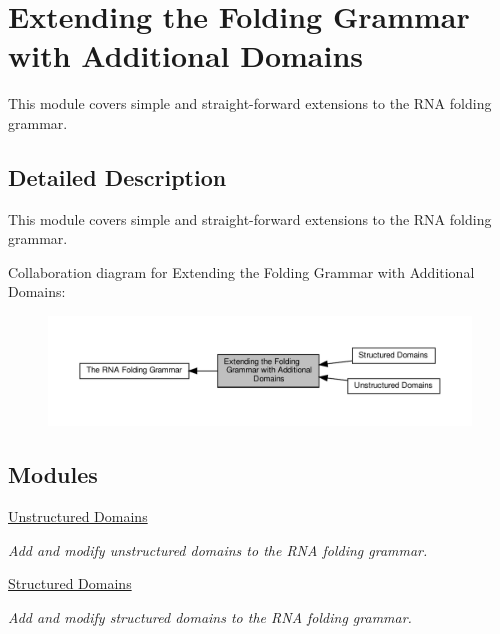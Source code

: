 \hypertarget{group__domains}{}\section{Extending the Folding Grammar with Additional Domains}
\label{group__domains}


This module covers simple and straight-\/forward extensions to the R\+NA folding grammar.  




\subsection{Detailed Description}
This module covers simple and straight-\/forward extensions to the R\+NA folding grammar. 

Collaboration diagram for Extending the Folding Grammar with Additional Domains\+:
\nopagebreak
\begin{figure}[H]
\begin{center}
\leavevmode
\includegraphics[width=350pt]{group__domains}
\end{center}
\end{figure}
\subsection*{Modules}
\begin{DoxyCompactItemize}
\item 
\hyperlink{group__domains__up}{Unstructured Domains}
\begin{DoxyCompactList}\small\item\em Add and modify unstructured domains to the R\+NA folding grammar. \end{DoxyCompactList}\item 
\hyperlink{group__domains__struc}{Structured Domains}
\begin{DoxyCompactList}\small\item\em Add and modify structured domains to the R\+NA folding grammar. \end{DoxyCompactList}\end{DoxyCompactItemize}

